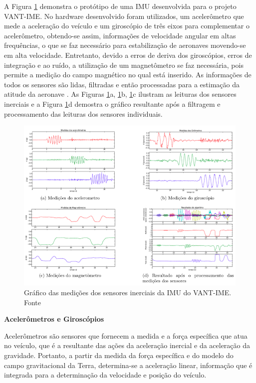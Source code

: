\documentclass[a4paper, 12pt]{article}
\begin{document}
A Figura \ref{fig:imuVANTIME} demonstra o protótipo de uma IMU desenvolvida para o projeto VANT-IME. No hardware desenvolvido foram utilizados, um acelerômetro que mede a aceleração do veículo e um giroscópio de três eixos para complementar o acelerômetro, obtendo-se assim, informações de velocidade angular em altas frequências, o que se faz necessário para estabilização de aeronaves movendo-se em alta velocidade. Entretanto, devido a erros de deriva dos giroscópios, erros de integração e ao ruído, a utilização de um magnetômetro se faz necessária, pois permite a medição do campo magnético no qual está inserido. As informações de todos os sensores são lidas, filtradas e então processadas para a estimação da atitude da aeronave \cite{Paixao2011}. As Figuras \ref{fig:imuVANTIME}a,  \ref{fig:imuVANTIME}b,  \ref{fig:imuVANTIME}c ilustram as leituras dos sensores inerciais e a Figura \ref{fig:imuVANTIME}d demostra o gráfico resultante após a filtragem e processamento das leituras dos sensores individuais.

\begin{figure}
	\centering
		\includegraphics[scale=0.5]{img/imu_VANTIME.png}
	\caption{Gráfico das medições dos sensores inerciais da IMU do VANT-IME. Fonte \cite{Paixao2011}}
	\label{fig:imuVANTIME}
\end{figure}

\noindent\textbf{Acelerômetros e Giroscópios}

Acelerômetros são sensores que fornecem a medida e a força específica que atua no veículo, que é a resultante das ações da aceleração inercial e da aceleração da gravidade. Portanto, a partir da medida da força específica e do modelo do campo gravitacional da Terra, determina-se a aceleração linear, informação que é integrada para a determinação da velocidade e posição do veículo.
\end{document}

